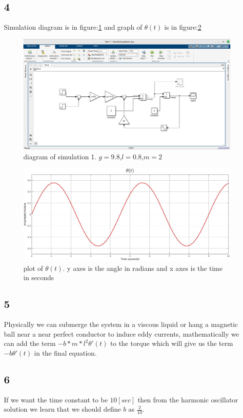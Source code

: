 \subsection{4}
Simulation diagram is in figure:\ref{sim:1} and graph of $\theta(t)$ is in figure:\ref{fig:sim1}
\begin{figure}
    \centering
    \includegraphics[width=\textwidth]{assets/hw1_sim1.png}
    \caption{diagram of simulation 1. $g=9.8$,$l=0.8$,$m=2$}
    \label{sim:1}
\end{figure}
\begin{figure}
    \centering
    \includegraphics[width=\textwidth]{assets/hw1_3_4.jpg}
    \caption{plot of $\theta(t)$. y axes is the angle in radians and x axes is the time in seconds}
    \label{fig:sim1}
\end{figure}
\subsection{5}
Physically we can submerge the system in a viscous liquid or hang a magnetic ball near a near perfect conductor to induce eddy currents, mathematically we can add the term $-b*m*l^2\theta'(t)$ to the torque which will give us the term $-b\theta'(t)$ in the final equation.
\subsection{6}
If we want the time constant to be $10[sec]$ then from the harmonic oscillator solution we learn that we should define $b$ as $\frac{2}{10}$.

